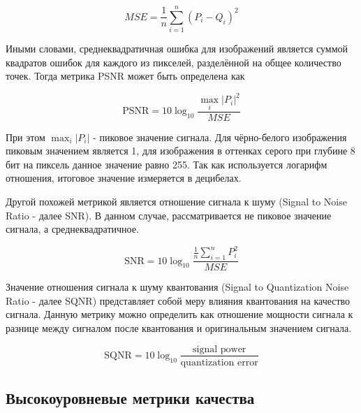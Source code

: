 \begin{equation} \label{eq:img_mse}
    MSE = \frac{1}{n} \sum_{i=1}^{n}\left(P_{i} - Q_{i}\right)^2
\end{equation}

Иными словами, среднеквадратичная ошибка для изображений является суммой
квадратов ошибок для каждого из пикселей, разделённой на общее количество точек.
Тогда метрика PSNR может быть определена как

\begin{equation} \label{eq:img_psnr}
    \text{PSNR} = 10\log_{10} \frac{\max_{i}\left|P_{i}\right|^{2}}{MSE}
\end{equation}

При этом $\max_{i}\left|P_{i}\right|$ - пиковое значение сигнала. Для
чёрно-белого изображения пиковым значением является 1, для изображения в
оттенках серого при глубине 8 бит на пиксель данное значение равно 255. Так как
используется логарифм отношения, итоговое значение измеряется в децибелах.


Другой похожей метрикой является отношение сигнала к шуму (Signal to Noise Ratio
- далее SNR). В данном случае, рассматривается не пиковое значение сигнала, а
среднеквадратичное.

\begin{equation} \label{eq:img_snr}
    \text{SNR} = 10\log_{10} \frac{\frac{1}{n}\sum_{i=1}^{n} P_{i}^{2}}{MSE}
\end{equation}

Значение отношения сигнала к шуму квантования (Signal to Quantization Noise
Ratio - далее SQNR) представляет собой меру влияния квантования на качество
сигнала. Данную метрику можно определить как отношение мощности сигнала к
разнице между сигналом после квантования и оригинальным значением сигнала.

\begin{equation} \label{eq:img_sqnr}
    \text{SQNR} = 10\log_{10} \frac{\text{signal power}}{\text{quantization error}}
\end{equation}

\subsection{Высокоуровневые метрики качества}

